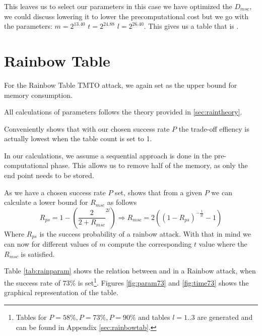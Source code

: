 This leaves us to select our parameters in this case we have optimized the $D_{msc}$, we could discuss lowering it to lower the precomputational cost but we go with the parameters: $m=2^{13.40}$  $t=2^{24.88}$  $l=2^{26.40}$.
This gives us a table that is .
\section{Rainbow Table}
\label{sec:rainbowparam}
For the Rainbow Table TMTO attack, we again set  as the
upper bound for memory consumption.

All calculations of parameters follows the theory provided in
\ref{sec:raintheory}.

Conveniently \cite[Fig.4]{176} shows that with our chosen success rate
$P$ the trade-off effiency is actually lowest when the table count is
set to 1.

In our calculations, we assume a sequential approach is done in the
pre-computational phase. This allows us to remove half of the memory,
as only the end point needs to be stored.

As we have a chosen success rate $P$ set, \cite[Proposition
29]{176} shows that from a given $P$ we can calculate a lower bound
for $R_{msc}$ as follows
\[R_{ps} = 1 - \left( \frac{2}{2 + R_{msc}}^{2l} \right) \Rightarrow R_{msc} = 2 ((1 - R_{ps})^{-\frac{1}{2l}} - 1)\]
Where $R_{ps}$ is the success probability of a rainbow attack. With
that in mind we can now for different values of $m$ compute the
corresponding $t$ value where the $R_{msc}$ is satisfied.

Table \ref{tab:rainparam} shows the relation between  and
 in a Rainbow attack, when the success rate of $73\%$ is set\footnote{Tables for $P = 58\%, P = 73\%, P = 90\%$ and tables $l=1..3$ are generated and can be
found in Appendix \ref{sec:rainbowtab}.}. Figures \ref{fig:param73}
and \ref{fig:time73} shows the graphical representation of the table.

